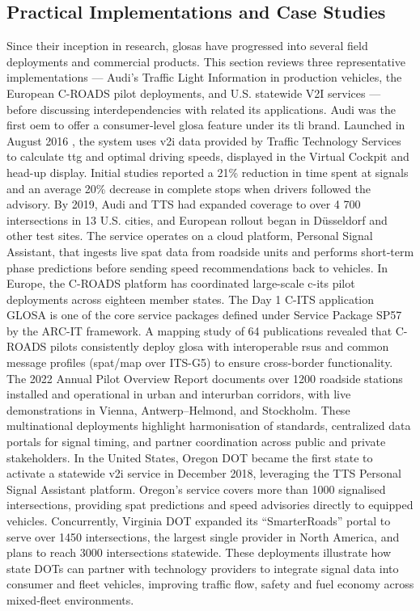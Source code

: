 \subsection{Practical Implementations and Case Studies}
\label{subsec:practical_implementations}

Since their inception in research, \acp{glosa} have progressed into several field deployments and commercial products. This section reviews three representative implementations --- Audi’s Traffic Light Information in production vehicles, the European C-ROADS pilot deployments, and U.S. statewide V2I services --- before discussing interdependencies with related \ac{its} applications.
\mynewline
Audi was the first \ac{oem} to offer a consumer‐level \ac{glosa} feature under its \ac{tli} brand. Launched in August 2016 \cite{AudiV2I2016}, the system uses \ac{v2i} data provided by Traffic Technology Services to calculate \ac{ttg} and optimal driving speeds, displayed in the Virtual Cockpit and head-up display. Initial studies reported a 21\% reduction in time spent at signals and an average 20\% decrease in complete stops when drivers followed the advisory. \cite{AudiTechTalk} By 2019, Audi and TTS had expanded coverage to over 4 700 intersections in 13 U.S. cities, and European rollout began in Düsseldorf and other test sites. The service operates on a cloud platform, Personal Signal Assistant, that ingests live \ac{spat} data from roadside units and performs short‐term phase predictions before sending speed recommendations back to vehicles. \cite{TTS2019}
In Europe, the C-ROADS platform has coordinated large-scale \ac{c-its} pilot deployments across eighteen member states. The Day 1 C-ITS application GLOSA is one of the core service packages defined under Service Package SP57 by the ARC-IT framework. \cite{ARCITSP57} A mapping study of 64 publications revealed that C-ROADS pilots consistently deploy \ac{glosa} with interoperable \acp{rsu} and common message profiles (\ac{spat}/\ac{map} over ITS-G5) to ensure cross-border functionality. \cite{Mellegard2020} The 2022 Annual Pilot Overview Report documents over 1200 roadside stations installed and operational in urban and interurban corridors, with live demonstrations in Vienna, Antwerp–Helmond, and Stockholm. \cite{CROADSPilot2022} These multinational deployments highlight harmonisation of standards, centralized data portals for signal timing, and partner coordination across public and private stakeholders.
In the United States, Oregon DOT became the first state to activate a statewide \ac{v2i} service in December 2018, leveraging the TTS Personal Signal Assistant platform. Oregon’s service covers more than 1000 signalised intersections, providing \ac{spat} predictions and speed advisories directly to equipped vehicles. Concurrently, Virginia DOT expanded its “SmarterRoads” portal to serve over 1450 intersections, the largest single provider in North America, and plans to reach 3000 intersections statewide. \cite{TTS2019} These deployments illustrate how state DOTs can partner with technology providers to integrate signal data into consumer and fleet vehicles, improving traffic flow, safety and fuel economy across mixed‐fleet environments.
